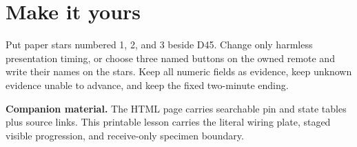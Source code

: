 \documentclass[11pt]{article}
\begin{document}
\section{Make it yours}

Put paper stars numbered 1, 2, and 3 beside D45. Change only harmless
presentation timing, or choose three named buttons on the owned remote and
write their names on the stars. Keep all numeric fields as evidence, keep
unknown evidence unable to advance, and keep the fixed two-minute ending.

\vfill\small
\textbf{Companion material.} The HTML page carries searchable pin and state
tables plus source links. This printable lesson carries the literal wiring
plate, staged visible progression, and receive-only specimen boundary.
\end{document}
